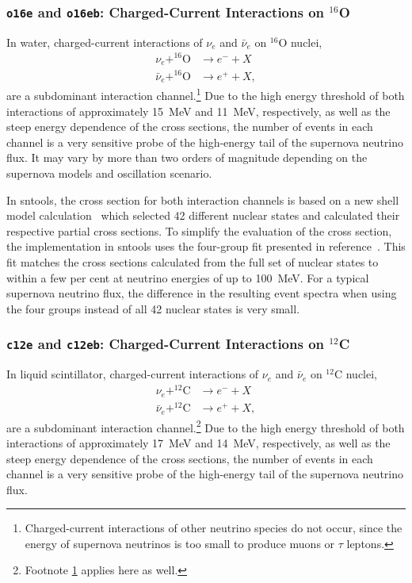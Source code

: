 \documentclass[11pt, oneside]{article}
\newcommand{\nue}{\ensuremath{\nu_e}\xspace}
\newcommand{\nuebar}{\ensuremath{\bar{\nu}_e}\xspace}
\begin{document}
\subsubsection{\texttt{o16e} and \texttt{o16eb}: Charged-Current Interactions on $^{16}$O}
In water, charged-current interactions of \nue and \nuebar on $^{16}$O nuclei,
\begin{align}
\nue + ^{16}\text{O} &\rightarrow e^- + X \\
\nuebar + ^{16}\text{O} &\rightarrow e^+ + X,
\end{align}
are a subdominant interaction channel.\footnote{\label{fn:cc-interactions}Charged-current interactions of other neutrino species do not occur, since the energy of supernova neutrinos is too small to produce muons or $\tau$ leptons.}
Due to the high energy threshold of both interactions of approximately \SI{15}{MeV} and \SI{11}{MeV}, respectively, as well as the steep energy dependence of the cross sections, the number of events in each channel is a very sensitive probe of the high-energy tail of the supernova neutrino flux.
It may vary by more than two orders of magnitude depending on the supernova models and oscillation scenario.

In sntools, the cross section for both interaction channels is based on a new shell model calculation~\cite{Suzuki2018} which selected 42 different nuclear states and calculated their respective partial cross sections.
To simplify the evaluation of the cross section, the implementation in sntools uses the four-group fit presented in reference~\cite{Nakazato2018}.
This fit matches the cross sections calculated from the full set of nuclear states to within a few per cent at neutrino energies of up to \SI{100}{MeV}.
For a typical supernova neutrino flux, the difference in the resulting event spectra when using the four groups instead of all 42 nuclear states is very small.


\subsubsection{\texttt{c12e} and \texttt{c12eb}: Charged-Current Interactions on $^{12}$C}
In liquid scintillator, charged-current interactions of \nue and \nuebar on $^{12}$C nuclei,
\begin{align}
\nue + ^{12}\text{C} &\rightarrow e^- + X \\
\nuebar + ^{12}\text{C} &\rightarrow e^+ + X,
\end{align}
are a subdominant interaction channel.\footnote{Footnote \ref{fn:cc-interactions} applies here as well.}
Due to the high energy threshold of both interactions of approximately \SI{17}{MeV} and \SI{14}{MeV}, respectively, as well as the steep energy dependence of the cross sections, the number of events in each channel is a very sensitive probe of the high-energy tail of the supernova neutrino flux.
\end{document}
